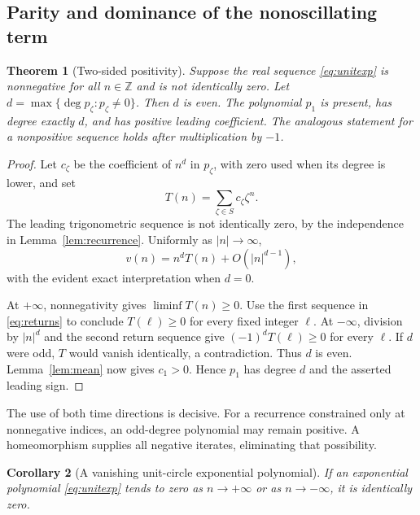 \documentclass[11pt,letterpaper]{article}
\newtheorem{theorem}{Theorem}[section]
\newtheorem{corollary}[theorem]{Corollary}
\theoremstyle{definition}
\theoremstyle{remark}
\newcommand{\Z}{\mathbb Z}
\newcommand{\degree}{\operatorname{deg}}
\begin{document}
\subsection{Parity and dominance of the nonoscillating term}

\begin{theorem}[Two-sided positivity]
\label{thm:positive}
Suppose the real sequence \eqref{eq:unitexp} is nonnegative for all
$n\in\Z$ and is not identically zero. Let
$d=\max\{\degree p_\zeta:p_\zeta\ne0\}$. Then $d$ is even.
The polynomial $p_1$ is present, has degree exactly $d$, and has positive
leading coefficient. The analogous statement for a nonpositive sequence
holds after multiplication by $-1$.
\end{theorem}

\begin{proof}
Let $c_\zeta$ be the coefficient of $n^d$ in $p_\zeta$, with zero used
when its degree is lower, and set
\begin{equation}
  T(n)=\sum_{\zeta\in S}c_\zeta\zeta^n.
\end{equation}
The leading trigonometric sequence is not identically zero, by the
independence in Lemma~\ref{lem:recurrence}. Uniformly as $|n|\to\infty$,
\begin{equation}
 v(n)=n^dT(n)+O(|n|^{d-1}),
 \label{eq:leadingT}
\end{equation}
with the evident exact interpretation when $d=0$.

At $+\infty$, nonnegativity gives $\liminf T(n)\ge0$. Use the first
sequence in \eqref{eq:returns} to conclude $T(\ell)\ge0$ for every fixed
integer $\ell$. At $-\infty$, division by $|n|^d$ and the second return
sequence give $(-1)^dT(\ell)\ge0$ for every $\ell$. If $d$ were odd,
$T$ would vanish identically, a contradiction. Thus $d$ is even.
Lemma~\ref{lem:mean} now gives $c_1>0$. Hence $p_1$ has degree $d$ and the
asserted leading sign.
\end{proof}

The use of both time directions is decisive. For a recurrence constrained
only at nonnegative indices, an odd-degree polynomial may remain
positive. A homeomorphism supplies all negative iterates, eliminating
that possibility.

\begin{corollary}[A vanishing unit-circle exponential polynomial]
\label{cor:vanishing}
If an exponential polynomial \eqref{eq:unitexp} tends to zero as
$n\to+\infty$ or as $n\to-\infty$, it is identically zero.
\end{corollary}
\end{document}
